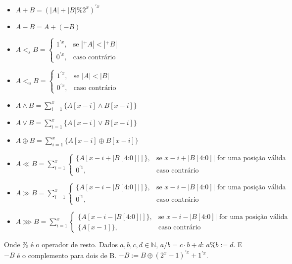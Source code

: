 \begin{itemize}
  \item $ A + B = (|A|+|B| \% 2^x)^{'x}  $
  \item $ A - B = A + (-B) $
  \item $ A <_s B = \begin{cases}
      1^{'x}, & \text{se } |^+A| < |^+B| \\
      0^{'x}, & \text{caso contrário}
      \end{cases}$

  \item $ A <_u B = \begin{cases}
      1^{'x}, & \text{se } |A| < |B| \\
      0^{'x}, & \text{caso contrário}
      \end{cases}$

  \item $ A \land B = \sum_{i=1}^x \{A[x-i] \land B[x-i]\} $
  \item $ A \lor B = \sum_{i=1}^x \{A[x-i] \lor B[x-i]\} $
  \item $ A \oplus B = \sum_{i=1}^x \{A[x-i] \oplus B[x-i]\} $
  \item $ A \ll B = \sum_{i=1}^{x} \begin{cases}
    \{A[x-i+|B[4\text{:}0]|]\}, & \text{se } x-i+|B[4\text{:}0]| \text{ for uma posição válida } \\
    0^{'1}, & \text{caso contrário}
    \end{cases}$ \\
  \item $ A \gg B = \sum_{i=1}^{x} \begin{cases}
    \{A[x-i-|B[4\text{:}0]|]\}, & \text{se } x-i-|B[4\text{:}0]| \text{ for uma posição válida } \\
    0^{'1}, & \text{caso contrário}
    \end{cases}$ \\
  \item $ A \ggg B = \sum_{i=1}^{x} \begin{cases}
    \{A[x-i-|B[4\text{:}0]|]\}, & \text{se } x-i-|B[4\text{:}0]| \text{ for uma posição válida } \\
    \{A[x-1]\}, & \text{caso contrário}
    \end{cases}$ \\
\end{itemize}

  Onde $\%$ é o operador de resto. Dados $a, b, c, d \in \mathbb{N} $, $a / b = c \cdot b + d $: $a\%b := d$.
  E $-B$ é o complemento para dois de B. $-B := B \oplus (2^x-1)^{'x} + 1^{'x}$.


